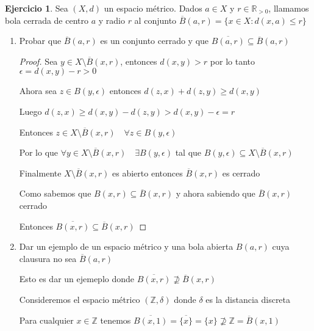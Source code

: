 \documentclass[12pt]{report}
\newcommand{\R}{\mathbb{R}}
\newcommand{\Z}{\mathbb{Z}}
\newcommand{\ol}{\overline}
\theoremstyle{definition}
\newtheorem{ej}{Ejercicio}
\begin{document}
\begin{ej}
Sea $(X,d)$ un espacio métrico. Dados $a \in X$ y $r \in \R_{>0}$, llamamos bola cerrada de centro $a$ y radio $r$ al conjunto $\ol{B}(a,r) = \{x \in X : d(x,a) \leq r\}$
\begin{enumerate}
  \item Probar que $\ol{B}(a,r)$ es un conjunto cerrado y que $\ol{B(a,r)} \subseteq \ol{B}(a,r)$
    \begin{proof}
      Sea $y \in X \setminus \ol{B}(x,r)$, entonces $d(x,y) > r$ por lo tanto $\epsilon = d(x,y) -r > 0$

      Ahora sea $z \in B(y,\epsilon)$ entonces $d(z,x) + d(z,y) \geq d(x,y)$

      Luego $d(z,x) \geq d(x,y) - d(z,y) > d(x,y) - \epsilon = r $

      Entonces $z \in X \setminus \ol{B}(x,r) \quad \forall z \in B(y,\epsilon)$

      Por lo que $\forall y \in X \setminus \ol{B}(x,r) \quad \exists B(y,\epsilon) $ tal que $ B(y,\epsilon) \subseteq X \setminus \ol{B}(x,r)$

      Finalmente $X \setminus \ol{B}(x,r)$ es abierto entonces $\ol{B}(x,r)$ es cerrado

      Como sabemos que $B(x,r)\subseteq \ol{B}(x,r)$ y ahora sabiendo que $\ol{B}(x,r)$ cerrado

      Entonces $\ol{B(x,r)} \subseteq \ol{B}(x,r)$
    \end{proof}
  \item Dar un ejemplo de un espacio métrico y una bola abierta $B(a,r)$ cuya clausura no sea $\ol{B}(a,r)$

    Esto es dar un ejemeplo donde $\ol{B(x,r)} \not\supseteq \ol{B}(x,r)$

    Consideremos el espacio métrico $(\Z,\delta)$ donde $\delta$ es la distancia discreta 

    Para cualquier $x \in \Z$ tenemos $\ol{B(x,1)} = \ol{\{x\}} = \{x\}\not\supseteq \Z = \ol{B}(x,1)$
\end{enumerate}
\end{ej}
\end{document}
